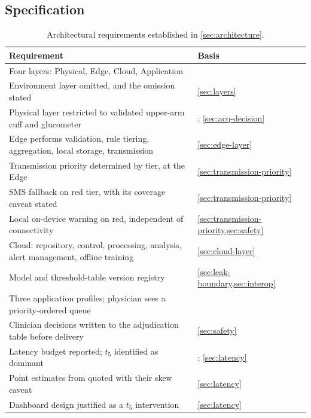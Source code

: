 \documentclass[12pt,a4paper,oneside]{report}
\begin{document}
\subsection{Specification}\label{sec:spec41}

\begin{table}[htbp]
\centering\footnotesize
\caption{Architectural requirements established in \cref{sec:architecture}.}\label{tab:spec41}
\begin{tabularx}{\textwidth}{@{}X >{\raggedright\arraybackslash}p{5.0cm}@{}}
\toprule
\textbf{Requirement} & \textbf{Basis} \\
\midrule
Four layers: Physical, Edge, Cloud, Application & \textcite{mucchi2021} \\
Environment layer omitted, and the omission stated & \cref{sec:layers} \\
Physical layer restricted to validated upper-arm cuff and glucometer & \textcite{who2023hypertension}; \cref{sec:acq-decision} \\
Edge performs validation, rule tiering, aggregation, local storage, transmission & \cref{sec:edge-layer} \\
Transmission priority determined by tier, at the Edge & \cref{sec:transmission-priority} \\
SMS fallback on red tier, with its coverage caveat stated & \cref{sec:transmission-priority} \\
Local on-device warning on red, independent of connectivity & \cref{sec:transmission-priority,sec:safety} \\
Cloud: repository, control, processing, analysis, alert management, offline training & \cref{sec:cloud-layer} \\
Model and threshold-table version registry & \cref{sec:leak-boundary,sec:interop} \\
Three application profiles; physician sees a priority-ordered queue & \textcite{yazdani2018} \\
Clinician decisions written to the adjudication table before delivery & \cref{sec:safety} \\
Latency budget reported; $t_5$ identified as dominant & \textcite{bediang2021}; \cref{sec:latency} \\
Point estimates from \textcite{bediang2021} quoted with their skew caveat & \cref{sec:latency} \\
Dashboard design justified as a $t_5$ intervention & \cref{sec:latency} \\

\end{tabularx}
\end{table}
\end{document}
